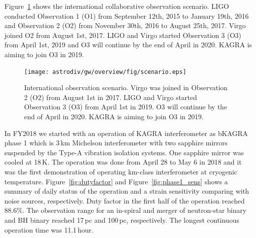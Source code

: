 Figure~\ref{fig:scenario} shows the international collaborative observation scenario\cite{scenario_paper}. LIGO conducted Observation 1 (O1) from September 12th, 2015 to January 19th, 2016 and Observation 2 (O2) from November 30th, 2016 to August 25th, 2017. Virgo joined O2 from August 1st, 2017. LIGO and Virgo started Observation  3 (O3) from April 1st, 2019 and O3 will continue by the end of April in 2020. KAGRA is aiming to join O3 in 2019.



\begin{figure}
\begin{center}
\texttt{[image: astrodiv/gw/overview/fig/scenario.eps]}
\caption{International observation scenario\cite{scenario_paper}. Virgo was joined in Observation 2 (O2) from August 1st in 2017. LIGO and Virgo  started Observation 3 (O3) from April 1st in 2019. O3 will continue by the end of April in 2020. KAGRA is aiming to join O3 in 2019.}
\label{fig:scenario}
\end{center}
\end{figure}






In FY2018 we started with an operation of KAGRA interferometer as bKAGRA phase 1 which is 3\,km Michelson interferometer with two sapphire mirrors suspended by the Type-A vibration isolation systems. One sapphire mirror was cooled at 18\,K. The operation was done from April 28 to May 6 in 2018 and it was the first demonstration of operating km-class interferometer at cryogenic temperature. Figure~\ref{fig:dutyfactor} and Figure~\ref{fig:phase1_sens} shows a summary of daily status of the operation and a strain sensitivity comparing with noise sources\cite{phase1_paper}, respectively. Duty factor in the first half of the operation reached 88.6\%. The observation range for an in-spiral and merger of neutron-star binary and BH binary reached 17\,pc and 100\,pc, respectively. The longest continuous operation time was 11.1\,hour. 





